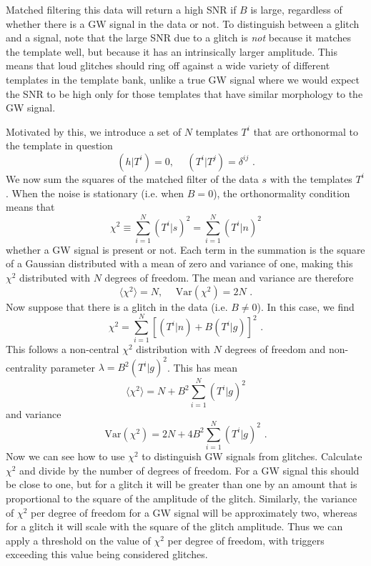 \documentclass[11pt]{cuthesis}
\newcommand{\fs}{\text{ .}}
\begin{document}
Matched filtering this data will return a high SNR if $B$ is large, regardless of whether there is a GW signal in the data or not.  To distinguish between a glitch and a signal, note that the large SNR due to a glitch is \textit{not} because it matches the template well, but because it has an intrinsically larger amplitude. This means that loud glitches should ring off against a wide variety of different templates in the template bank, unlike a true GW signal where we would expect the SNR to be high only for those templates that have similar morphology to the GW signal. 

Motivated by this, we introduce a set of $N$ templates $T^i$ that are orthonormal to the template in question
\begin{equation}
(h|T^i) = 0, \hspace{15pt} (T^i|T^j) = \delta^{ij} \fs
\end{equation}
We now sum the squares of the matched filter of the data $s$ with the templates $T^i$. When the noise is stationary (i.e. when $B=0$), the orthonormality condition means that 
\begin{equation}
\chi^2 \equiv \sum_{i=1}^N(T^i|s)^2 = \sum_{i=1}^N(T^i|n)^2
\end{equation} 
whether a GW signal is present or not. Each term in the summation is the square of a Gaussian distributed with a mean of zero and variance of one, making this $\chi^2$ distributed with $N$ degrees of freedom. The mean and variance are therefore
\begin{equation}
\langle \chi^2 \rangle = N, \hspace{15pt} \text{Var}(\chi^2) = 2N \fs
\end{equation}
Now suppose that there is a glitch in the data (i.e. $B \neq 0$). In this case, we find
\begin{equation}
\chi^2 = \sum_{i=1}^N [ (T^i|n) + B(T^i|g)]^2 \fs
\end{equation}
This follows a non-central $\chi^2$ distribution with $N$ degrees of freedom and non-centrality parameter $\lambda = B^2(T^i|g)^2$.
This has mean
\begin{equation}
\langle \chi^2 \rangle = N + B^2 \sum_{i=1}^N (T^i|g)^2
\end{equation}
and variance
\begin{equation}
\text{Var}(\chi^2) = 2N + 4B^2 \sum_{i=1}^N (T^i|g)^2\fs
\end{equation}
Now we can see how to use $\chi^2$ to distinguish GW signals from glitches. Calculate $\chi^2$ and divide by the number of degrees of freedom. For a GW signal this should be close to one, but for a glitch it will be greater than one by an amount that is proportional to the square of the amplitude of the glitch. Similarly, the variance of $\chi^2$ per degree of freedom for a GW signal will be approximately two, whereas for a glitch it will scale with the square of the glitch amplitude. Thus we can apply a threshold on the value of $\chi^2$ per degree of freedom, with triggers exceeding this value being considered glitches. 
\end{document}
